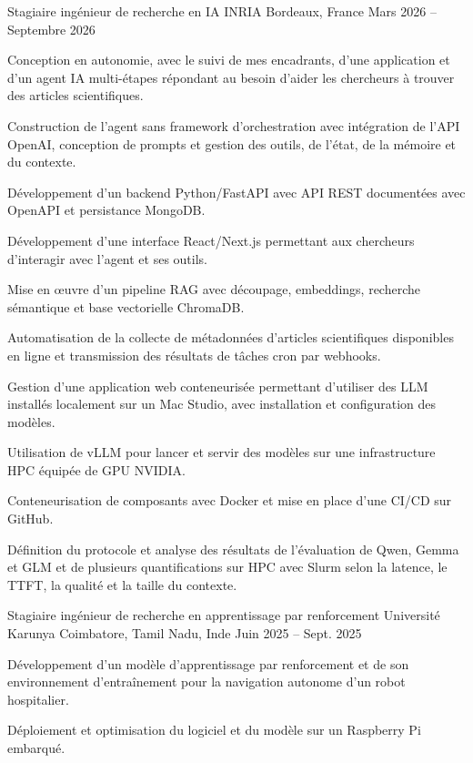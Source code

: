 
\begin{cventries}
  \cventry
    {Stagiaire ingénieur de recherche en IA}
    {INRIA}
    {Bordeaux, France}
    {Mars 2026 -- Septembre 2026}
    {
      \begin{cvitems}
        \item {Conception en autonomie, avec le suivi de mes encadrants, d’une application et d’un agent IA multi-étapes répondant au besoin d’aider les chercheurs à trouver des articles scientifiques.}
        \item {Construction de l’agent sans framework d’orchestration avec intégration de l’API OpenAI, conception de prompts et gestion des outils, de l’état, de la mémoire et du contexte.}
        \item {Développement d’un backend Python/FastAPI avec API REST documentées avec OpenAPI et persistance MongoDB.}
        \item {Développement d’une interface React/Next.js permettant aux chercheurs d’interagir avec l’agent et ses outils.}
        \item {Mise en œuvre d’un pipeline RAG avec découpage, embeddings, recherche sémantique et base vectorielle ChromaDB.}
        \item {Automatisation de la collecte de métadonnées d’articles scientifiques disponibles en ligne et transmission des résultats de tâches cron par webhooks.}
        \item {Gestion d’une application web conteneurisée permettant d’utiliser des LLM installés localement sur un Mac Studio, avec installation et configuration des modèles.}
        \item {Utilisation de vLLM pour lancer et servir des modèles sur une infrastructure HPC équipée de GPU NVIDIA.}
        \item {Conteneurisation de composants avec Docker et mise en place d’une CI/CD sur GitHub.}
        \item {Définition du protocole et analyse des résultats de l’évaluation de Qwen, Gemma et GLM et de plusieurs quantifications sur HPC avec Slurm selon la latence, le TTFT, la qualité et la taille du contexte.}
      \end{cvitems}
    }

  \cventry
    {Stagiaire ingénieur de recherche en apprentissage par renforcement}
    {Université Karunya}
    {Coimbatore, Tamil Nadu, Inde}
    {Juin 2025 -- Sept. 2025}
    {
      \begin{cvitems}
        \item {Développement d’un modèle d’apprentissage par renforcement et de son environnement d’entraînement pour la navigation autonome d’un robot hospitalier.}
        \item {Déploiement et optimisation du logiciel et du modèle sur un Raspberry Pi embarqué.}
      \end{cvitems}
    }
\end{cventries}
